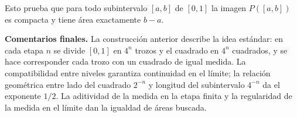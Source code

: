 \begin{solucion}
Esto prueba que para todo subintervalo \([a,b]\) de \([0,1]\) la imagen \(P([a,b])\) es compacta y tiene área exactamente \(b-a\).

\textbf{Comentarios finales.} La construcción anterior describe la idea estándar: en cada etapa \(n\) se divide \([0,1]\) en \(4^n\) trozos y el cuadrado en \(4^n\) cuadrados, y se hace corresponder cada trozo con un cuadrado de igual medida. La compatibilidad entre niveles garantiza continuidad en el límite; la relación geométrica entre lado del cuadrado \(2^{-n}\) y longitud del subintervalo \(4^{-n}\) da el exponente \(1/2\). La aditividad de la medida en la etapa finita y la regularidad de la medida en el límite dan la igualdad de áreas buscada.  
\end{solucion}
